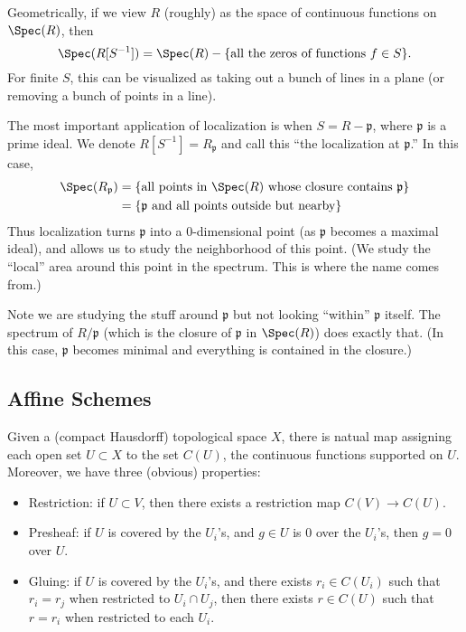 Geometrically, if we view $R$ (roughly) as the space of continuous functions on $\Spec(R)$, then
\[
    \Spec(R[S^{-1}]) = \Spec(R) - \{ \text{all the zeros of functions } f \in S \}.
\]
For finite $S$, this can be visualized as taking out a bunch of lines in a plane (or removing a bunch of points in a line).

The most important application of localization is when $S = R - \mathfrak p$, where $\mathfrak p$ is a prime ideal. We denote $R[S^{-1}] = R_{\mathfrak p}$ and call this ``the localization at $\mathfrak p$.'' In this case,
\[
    \begin{split}
        \Spec(R_{\mathfrak p}) & = \{\text{all points in $\Spec(R)$ whose closure contains } \mathfrak p\} \\
                               & = \{\text{$\mathfrak p$ and all points outside but nearby}\}
    \end{split}
\]
Thus localization turns $\mathfrak p$ into a 0-dimensional point (as $\mathfrak p$ becomes a maximal ideal), and allows us to study the neighborhood of this point. (We study the ``local'' area around this point in the spectrum. This is where the name comes from.)

Note we are studying the stuff around $\mathfrak p$ but not looking ``within'' $\mathfrak p$ itself. The spectrum of $R/\mathfrak p$ (which is the closure of $\mathfrak p$ in $\Spec(R)$) does exactly that. (In this case, $\mathfrak p$ becomes minimal and everything is contained in the closure.)

\subsection{Affine Schemes}
Given a (compact Hausdorff) topological space $X$, there is natual map assigning each open set $U \subset X$ to the set $C(U)$, the continuous functions supported on $U$. Moreover, we have three (obvious) properties:
\begin{itemize}
    \item Restriction: if $U \subset V$, then there exists a restriction map $C(V) \to C(U)$.
    \item Presheaf: if $U$ is covered by the $U_i$'s, and $g \in U$ is 0 over the $U_i$'s, then $g = 0$ over $U$.
    \item Gluing: if $U$ is covered by the $U_i$'s, and there exists $r_i \in C(U_i)$ such that $r_i = r_j$ when restricted to $U_i \cap U_j$, then there exists $r \in C(U)$ such that $r = r_i$ when restricted to each $U_i$.
\end{itemize}

